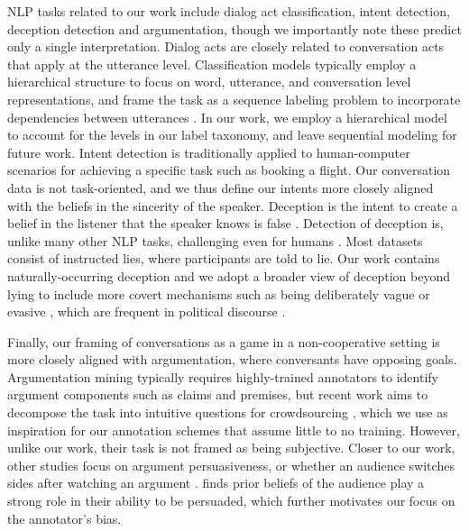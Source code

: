 NLP tasks related to our work include dialog act classification, intent detection, deception detection and argumentation, though we importantly note these predict only a single interpretation. Dialog acts are closely related to conversation acts that apply at the utterance level. Classification models typically employ a hierarchical structure to focus on word, utterance, and conversation level representations, and frame the task as a sequence labeling problem to incorporate dependencies between utterances \cite{Chen:2018}. In our work, we employ a hierarchical model to account for the levels in our label taxonomy, and leave sequential modeling for future work. Intent detection is traditionally applied to human-computer scenarios for achieving a specific task such as booking a flight. 
Our conversation data is not task-oriented, and we thus define our intents more closely aligned with the beliefs in the sincerity of the speaker. Deception is the intent to create a belief in the listener that the speaker knows is false \cite{Girlea:2017}. Detection of deception is, unlike many other NLP tasks, challenging even for humans \cite{Ott:2011}.
Most datasets consist of instructed lies, where participants are told to lie. 
Our work contains naturally-occurring deception and we adopt a broader view of deception beyond lying to include more covert mechanisms such as being deliberately vague or evasive \cite{Clementson:2018}, which are frequent in political discourse \cite{Bull:2008}. 

Finally, our framing of conversations as a game in a non-cooperative setting is more closely aligned with argumentation, where conversants have opposing goals. Argumentation mining typically requires highly-trained annotators to identify argument components such as claims and premises, but recent work aims to decompose the task into intuitive questions for crowdsourcing \cite{Miller:2019}, which we use as inspiration for our annotation schemes that assume little to no training. However, unlike our work, their task is not framed as being subjective. Closer to our work, other studies focus on argument persuasiveness, or whether an audience switches sides after watching an argument \cite{Zhang:2016,Durmus:2018}.  finds prior beliefs of the audience play a strong role in their ability to be persuaded, which further motivates our focus on the annotator's bias.
 
